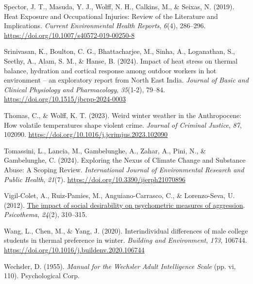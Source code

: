 \documentclass[
  man,
  floatsintext,
  longtable,
  nolmodern,
  notxfonts,
  notimes,
  colorlinks=true,linkcolor=blue,citecolor=blue,urlcolor=blue]{apa7}
\newlength{\cslhangindent}
\newenvironment{CSLReferences}[2] %
 {\begin{list}{}{%
  \setlength{\itemindent}{0pt}
  \setlength{\leftmargin}{0pt}
  \setlength{\parsep}{0pt}
  \ifodd #1
   \setlength{\leftmargin}{\cslhangindent}
   \setlength{\itemindent}{-1\cslhangindent}
  \fi
  \setlength{\itemsep}{#2\baselineskip}}}
 {\end{list}}
\begin{document}
\begin{CSLReferences}{1}{0}
Spector, J. T., Masuda, Y. J., Wolff, N. H., Calkins, M., \& Seixas, N.
(2019). Heat {Exposure} and {Occupational Injuries}: {Review} of the
{Literature} and {Implications}. \emph{Current Environmental Health
Reports}, \emph{6}(4), 286--296.
\url{https://doi.org/10.1007/s40572-019-00250-8}

Srinivasan, K., Boulton, C. G., Bhattacharjee, M., Sinha, A.,
Loganathan, S., Seethy, A., Alam, S. M., \& Hanse, B. (2024). Impact of
heat stress on thermal balance, hydration and cortical response among
outdoor workers in hot environment -- an exploratory report from {North
East India}. \emph{Journal of Basic and Clinical Physiology and
Pharmacology}, \emph{35}(1-2), 79--84.
\url{https://doi.org/10.1515/jbcpp-2024-0003}

Thomas, C., \& Wolff, K. T. (2023). Weird winter weather in the
{Anthropocene}: {How} volatile temperatures shape violent crime.
\emph{Journal of Criminal Justice}, \emph{87}, 102090.
\url{https://doi.org/10.1016/j.jcrimjus.2023.102090}

Tomassini, L., Lancia, M., Gambelunghe, A., Zahar, A., Pini, N., \&
Gambelunghe, C. (2024). Exploring the {Nexus} of {Climate Change} and
{Substance Abuse}: {A Scoping Review}. \emph{International Journal of
Environmental Research and Public Health}, \emph{21}(7).
\url{https://doi.org/10.3390/ijerph21070896}

Vigil-Colet, A., Ruiz-Pamies, M., Anguiano-Carrasco, C., \&
Lorenzo-Seva, U. (2012).
\href{https://www.ncbi.nlm.nih.gov/pubmed/22420362}{The impact of social
desirability on psychometric measures of aggression}. \emph{Psicothema},
\emph{24}(2), 310--315.

Wang, L., Chen, M., \& Yang, J. (2020). Interindividual differences of
male college students in thermal preference in winter. \emph{Building
and Environment}, \emph{173}, 106744.
\url{https://doi.org/10.1016/j.buildenv.2020.106744}

Wechsler, D. (1955). \emph{Manual for the {Wechsler Adult Intelligence
Scale}} (pp. vi, 110). Psychological Corp.

\end{CSLReferences}
\end{document}
